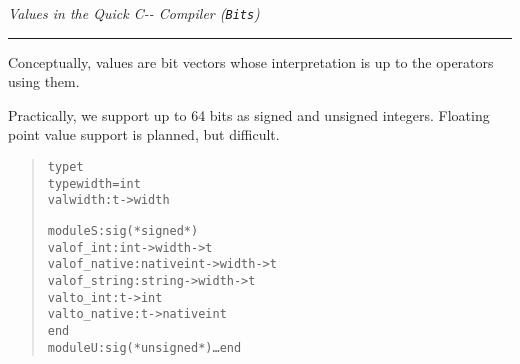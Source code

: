 \documentclass{seminar}
\def\heading#1{\textsf{\textit{#1}}\vskip2pt\hrule\bigskip}
\def\PAL{\hbox{C-{}-}}
\let\C\PAL
\begin{document}

\begin{slide}
    \heading{Values in the Quick {\C} Compiler (\texttt{Bits})}

    Conceptually, values are bit vectors whose interpretation is up to
    the operators using them.

    Practically, we support up to 64 bits as signed and unsigned
    integers.  Floating point value support is planned, but difficult.

    \begin{quote}
    \begin{alltt}
type t
type width = int
val width : t -> width

module S: sig  (* signed *) 
    val of_int:     int       -> width -> t 
    val of_native:  nativeint -> width -> t
    val of_string:  string    -> width -> t
    val to_int:     t -> int
    val to_native:  t -> nativeint
end
module U: sig (* unsigned *) \dots end
    \end{alltt}
    \end{quote}
\end{slide}

\end{document}
